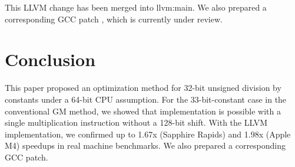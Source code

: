 \documentclass{article}
\begin{document}
This LLVM change has been merged into llvm:main.
We also prepared a corresponding GCC patch \cite{GCCpatch}, which is currently under review.

\section{Conclusion}
This paper proposed an optimization method for 32-bit unsigned division by constants under a 64-bit CPU assumption.
For the 33-bit-constant case in the conventional GM method, we showed that implementation is possible with a single multiplication instruction without a 128-bit shift.
With the LLVM implementation, we confirmed up to 1.67x (Sapphire Rapids) and 1.98x (Apple M4) speedups in real machine benchmarks.
We also prepared a corresponding GCC patch.



\end{document}
